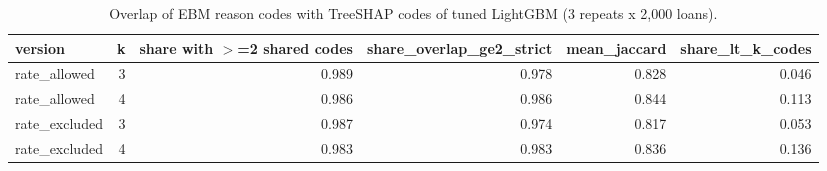 \begin{table}[t]
\centering
\caption{Overlap of EBM reason codes with TreeSHAP codes of tuned LightGBM (3 repeats x 2,000 loans).}
\label{tab:T13c_reason_codes}
\small
\begin{tabular}{lrrrrr}
\toprule
version & k & share with $>$=2 shared codes & share\_overlap\_ge2\_strict & mean\_jaccard & share\_lt\_k\_codes \\
\midrule
rate\_allowed & 3 & 0.989 & 0.978 & 0.828 & 0.046 \\
rate\_allowed & 4 & 0.986 & 0.986 & 0.844 & 0.113 \\
rate\_excluded & 3 & 0.987 & 0.974 & 0.817 & 0.053 \\
rate\_excluded & 4 & 0.983 & 0.983 & 0.836 & 0.136 \\
\bottomrule
\end{tabular}
\end{table}
